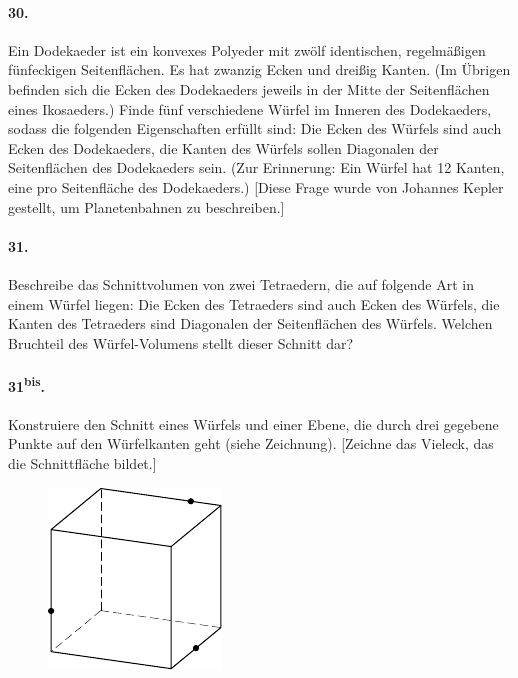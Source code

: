 \documentclass[10pt,a5paper,twoside]{article}
\newenvironment{problem}[1]{\paragraph*{#1}}{}
\begin{document}
\begin{problem}{30.}
	Ein Dodekaeder ist ein konvexes Polyeder mit zwölf identischen, regelmäßigen fünfeckigen Seitenflächen. Es hat zwanzig Ecken und dreißig Kanten. (Im Übrigen befinden sich die Ecken des Dodekaeders jeweils in der Mitte der Seitenflächen eines Ikosaeders.)
	Finde fünf verschiedene Würfel im Inneren des Dodekaeders, sodass die folgenden Eigenschaften erfüllt sind: Die Ecken des Würfels sind auch Ecken des Dodekaeders, die Kanten des Würfels sollen Diagonalen der Seitenflächen des Dodekaeders sein. (Zur Erinnerung: Ein Würfel hat 12 Kanten, eine pro Seitenfläche des Dodekaeders.) 
	[Diese Frage wurde von Johannes Kepler gestellt, um Planetenbahnen zu beschreiben.]
\end{problem}

\begin{problem}{31.}
	Beschreibe das Schnittvolumen von zwei Tetraedern, die auf folgende Art in einem Würfel liegen: Die Ecken des Tetraeders sind auch Ecken des Würfels, die Kanten des Tetraeders sind Diagonalen der Seitenflächen des Würfels.
	Welchen Bruchteil des Würfel-Volumens stellt dieser Schnitt dar?
\end{problem}

\begin{problem}{31\textsuperscript{bis}.} 
	Konstruiere den Schnitt eines Würfels und einer Ebene, die durch drei gegebene Punkte auf den Würfelkanten geht (siehe Zeichnung). [Zeichne das Vieleck, das die Schnittfläche bildet.]
	\begin{figure}[H]
	\centering
	\includegraphics{taskbook-15}
	\end{figure}
\end{problem}
\end{document}
